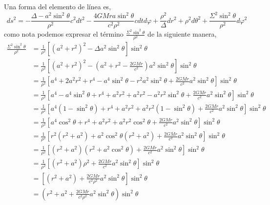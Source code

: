 Una forma del elemento de línea es,
$$
    d s^2 =-\frac{\Delta-a^2 \sin ^2 \theta}{\rho^2} c^2 d t^2-\frac{4 G M r a \sin ^2 \theta}{c^2 \rho^2} c d t d \varphi+\frac{\rho^2}{\Delta} d r^2+\rho^2 d \theta^2+\frac{\Sigma^2 \sin ^2 \theta}{\rho^2} d \varphi^2
$$
como nota podemos expresar el término $\frac{\Sigma^2 \sin ^2 \theta}{\rho^2}$ de la siguiente manera,
\begin{equation}
    \begin{aligned}
        \frac{\Sigma^2 \sin ^2 \theta}{\rho^2} & =\frac{1}{\rho^2}\left[\left(a^2+r^2\right)^2-\Delta a^2 \sin ^2 \theta\right] \sin ^2 \theta                                                                         \\
                                               & =\frac{1}{\rho^2}\left[\left(a^2+r^2\right)^2-\left(a^2+r^2-\frac{2 G M r}{c^2}\right) a^2 \sin ^2 \theta\right] \sin ^2 \theta                                       \\
                                               & =\frac{1}{\rho^2}\left[a^4+2 a^2 r^2+r^4-a^4 \sin ^2 \theta-r^2 a^2 \sin ^2 \theta+\frac{2 G M r}{c^2} a^2 \sin ^2 \theta\right] \sin ^2 \theta                       \\
                                               & =\frac{1}{\rho^2}\left[a^4-a^4 \sin ^2 \theta+r^4+a^2 r^2+a^2 r^2-a^2 r^2 \sin ^2 \theta+\frac{2 G M r}{c^2} a^2 \sin ^2 \theta\right] \sin ^2 \theta                 \\
                                               & =\frac{1}{\rho^2}\left[a^4\left(1-\sin ^2 \theta\right)+r^4+a^2 r^2+a^2 r^2\left(1-\sin ^2 \theta\right)+\frac{2 G M r}{c^2} a^2 \sin ^2 \theta\right] \sin ^2 \theta \\
                                               & =\frac{1}{\rho^2}\left[a^4 \cos ^2 \theta+r^4+a^2 r^2+a^2 r^2 \cos ^2 \theta+\frac{2 G M r}{c^2} a^2 \sin ^2 \theta\right] \sin ^2 \theta                             \\
                                               & =\frac{1}{\rho^2}\left[r^2\left(r^2+a^2\right)+a^2 \cos ^2 \theta\left(r^2+a^2\right)+\frac{2 G M r}{c^2} a^2 \sin ^2 \theta\right] \sin ^2 \theta                    \\
                                               & =\frac{1}{\rho^2}\left[\left(r^2+a^2\right)\left(r^2+a^2 \cos ^2 \theta\right)+\frac{2 G M r}{c^2} a^2 \sin ^2 \theta\right] \sin ^2 \theta                           \\
                                               & =\frac{1}{\rho^2}\left[\left(r^2+a^2\right) \rho^2+\frac{2 G M r}{c^2} a^2 \sin ^2 \theta\right] \sin ^2 \theta                                                       \\
                                               & =\left[\left(r^2+a^2\right)+\frac{2 G M r}{c^2 \rho^2} a^2 \sin ^2 \theta\right] \sin ^2 \theta                                                                       \\
                                               & =\left(r^2+a^2+\frac{2 G M r}{c^2 \rho^2} a^2 \sin ^2 \theta\right) \sin ^2 \theta
    \end{aligned}
\end{equation}


